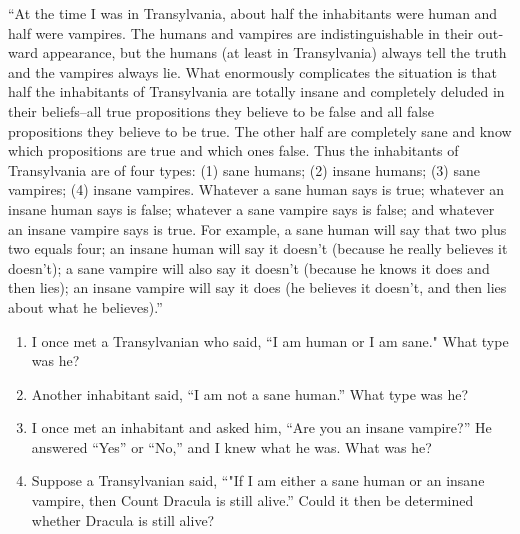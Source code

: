 \documentclass[12pt,letterpaper,boxed,cm]{hmcpset}
\begin{document}
\begin{solution}
    \vfill
\end{solution}
\newpage

\begin{problem}[5.]
    [8 points] ``At the time I was in Transylvania, about half the inhabitants were human and half were vampires. The humans and vampires are indistinguishable in their out­ward appearance, but the humans (at least in Transylvania) always tell the truth and the vampires always lie. What enormously complicates the situation is that half the in­habitants of Transylvania are totally insane and completely deluded in their beliefs–all true propositions they believe to be false and all false propositions they believe to be true. The other half are completely sane and know which pro­positions are true and which ones false. Thus the inhabi­tants of Transylvania are of four types: (1) sane humans; (2) insane humans; (3) sane vampires; (4) insane vampires. Whatever a sane human says is true; whatever an insane human says is false; whatever a sane vampire says is false; and whatever an insane vampire says is true. For example, a sane human will say that two plus two equals four; an insane human will say it doesn't (because he really believes it doesn't); a sane vampire will also say it doesn't (because he knows it does and then lies); an insane vampire will say it does (he believes it doesn't, and then lies about what he believes).''
    \begin{enumerate}[label=\Alph*.]
        \item I once met a Transylvanian who said, “I am human or I am sane."  What type was he?
        \item Another inhabitant said, ``I am not a sane human.'' What type was he?
        \item I once met an inhabitant and asked him, ``Are you an insane vampire?'' He answered ``Yes'' or ``No,'' and I knew what he was. What was he?
        \item Suppose a Transylvanian said, ``"If I am either a sane human or an insane vampire, then Count Dracula is still alive.'' Could it then be determined whether Dracula is still alive?

    \end{enumerate}
\end{problem}

\begin{solution}
    \vfill
\end{solution}
\newpage
\end{document}
